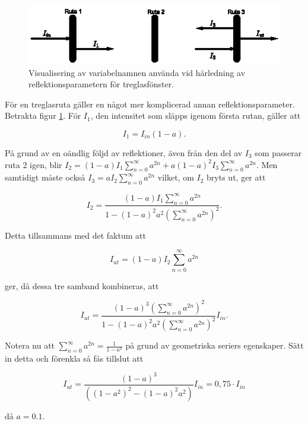 \begin{figure}[hpbt]
\centering
\includegraphics[scale=2]{images/tripleglazing.eps}
\caption{Visualisering av variabelnamnen använda vid härledning av reflektionsparametern för treglasfönster.}
\label{fig:tripleglazing}
\end{figure}

För en treglasruta gäller en något mer komplicerad annan reflektionsparameter. Betrakta figur \ref{fig:tripleglazing}. För $I_1$, den intensitet som släpps igenom första rutan, gäller att 

\begin{equation}
I_1=I_{in}\left( 1-a \right).
\end{equation}

På grund av en oändlig följd av reflektioner, även från den del av $I_3$ som passerar ruta 2 igen, blir $I_2 = \left( 1-a \right) I_1 \sum_{n=0}^{\infty} a^{2n} + a \left( 1-a \right)^2 I_3 \sum_{n=0}^{\infty} a^{2n}$. Men samtidigt måste också $I_3 = aI_2\sum_{n=0}^{\infty} a^{2n}$ vilket, om $I_2$ bryts ut, ger att

\begin{equation}
I_2 = \frac{\left( 1-a \right) I_1 \sum_{n=0}^{\infty} a^{2n}}{1-\left( 1-a \right)^2a^2\left(\sum_{n=0}^{\infty} a^{2n}\right)^2}.
\end{equation}

Detta tillsammans med det faktum att 

\begin{equation}
I_{ut} = \left( 1-a \right)I_2\sum_{n=0}^{\infty} a^{2n}
\end{equation}

ger, då dessa tre samband kombineras, att

\begin{equation}
I_{ut} = \frac{\left( 1-a \right)^3\left( \sum_{n=0}^{\infty} a^{2n}\right)^2}{1-\left( 1-a \right)^2a^2\left(\sum_{n=0}^{\infty} a^{2n}\right)^2}I_{in}.
\end{equation}

Notera nu att $\sum_{n=0}^{\infty} a^{2n} = \frac{1}{1-a^2}$ på grund av geometriska seriers egenskaper. Sätt in detta och förenkla så fås tillslut att

\begin{equation}
I_{ut} = \frac{\left( 1-a \right)^3}{\left(\left( 1-a^2\right)^2 - \left(1-a\right)^2 a^2\right)}I_{in} = 0,75 \cdot I_{in}
\end{equation}

då $a=0.1$.
